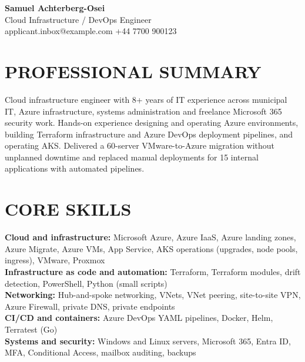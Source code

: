 \documentclass[11pt,a4paper]{article}
\begin{document}
\begin{center}
{\Huge\bfseries\color{primarycolor} Samuel Achterberg-Osei}\\[0.35em]
{\large\color{accentcolor} Cloud Infrastructure / DevOps Engineer}\\[0.25em]
applicant.inbox@example.com \textbar{} +44 7700 900123
\end{center}

\section*{PROFESSIONAL SUMMARY}
Cloud infrastructure engineer with 8+ years of IT experience across municipal IT, Azure infrastructure, systems administration and freelance Microsoft 365 security work. Hands-on experience designing and operating Azure environments, building Terraform infrastructure and Azure DevOps deployment pipelines, and operating AKS. Delivered a 60-server VMware-to-Azure migration without unplanned downtime and replaced manual deployments for 15 internal applications with automated pipelines.

\section*{CORE SKILLS}
\textbf{Cloud and infrastructure:} Microsoft Azure, Azure IaaS, Azure landing zones, Azure Migrate, Azure VMs, App Service, AKS operations (upgrades, node pools, ingress), VMware, Proxmox\\
\textbf{Infrastructure as code and automation:} Terraform, Terraform modules, drift detection, PowerShell, Python (small scripts)\\
\textbf{Networking:} Hub-and-spoke networking, VNets, VNet peering, site-to-site VPN, Azure Firewall, private DNS, private endpoints\\
\textbf{CI/CD and containers:} Azure DevOps YAML pipelines, Docker, Helm, Terratest (Go)\\
\textbf{Systems and security:} Windows and Linux servers, Microsoft 365, Entra ID, MFA, Conditional Access, mailbox auditing, backups
\end{document}
